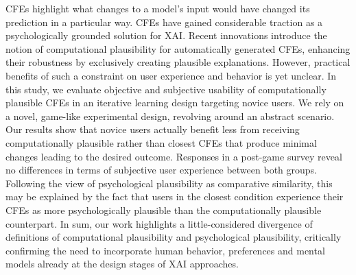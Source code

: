 \Glspl{CFE} highlight what changes to a model's input would have changed its prediction in a particular way. \Glspl{CFE} have gained considerable traction as a psychologically grounded solution for \gls{XAI}. 
Recent innovations introduce the notion of computational plausibility for automatically generated \glspl{CFE}, enhancing their robustness by exclusively creating plausible explanations. %
However, practical benefits of such a constraint on user experience and behavior is yet unclear.
In this study, we evaluate objective and subjective usability of computationally plausible \glspl{CFE} in an iterative learning design targeting novice users.
We rely on a novel, game-like experimental design, revolving around an abstract scenario.
Our results show that novice users actually benefit less from receiving computationally plausible rather than closest \glspl{CFE} that produce minimal changes leading to the desired outcome.
Responses in a post-game survey reveal no differences in terms of subjective user experience between both groups.
Following the view of psychological plausibility as comparative similarity, this may be explained by the fact that users in the closest condition experience their \glspl{CFE} as more psychologically plausible than the computationally plausible counterpart.
In sum, our work highlights a little-considered divergence of definitions of computational plausibility and psychological plausibility, critically confirming the need to incorporate human behavior, preferences and mental models already at the design stages of \gls{XAI} approaches.